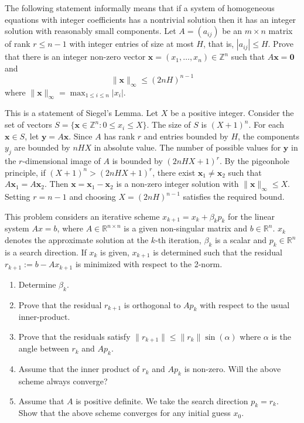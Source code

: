 \begin{exercise}
\label{applied:2016:8}
The following statement informally means that if a system of homogeneous equations with integer coefficients has a nontrivial solution then it has an integer solution with reasonably small components.
Let $A = (a_{ij})$ be an $m \times n$ matrix of rank $r \leq n-1$ with integer entries of size at most $H$, that is, $|a_{ij}| \leq H$.
Prove that there is an integer non-zero vector $\mathbf{x} = (x_1, \ldots, x_n) \in \mathbb{Z}^n$ such that $A\mathbf{x} = \mathbf{0}$ and
\[
\|\mathbf{x}\|_\infty \leq (2nH)^{n-1}
\]
where $\|\mathbf{x}\|_\infty = \max_{1 \leq i \leq n} |x_i|$.
\end{exercise}

\begin{solution}
This is a statement of Siegel's Lemma. Let $X$ be a positive integer. Consider the set of vectors $S = \{ \mathbf{x} \in \mathbb{Z}^n : 0 \le x_i \le X \}$. The size of $S$ is $(X+1)^n$. For each $\mathbf{x} \in S$, let $\mathbf{y} = A\mathbf{x}$. Since $A$ has rank $r$ and entries bounded by $H$, the components $y_j$ are bounded by $nHX$ in absolute value. The number of possible values for $\mathbf{y}$ in the $r$-dimensional image of $A$ is bounded by $(2nHX+1)^r$. By the pigeonhole principle, if $(X+1)^n > (2nHX+1)^r$, there exist $\mathbf{x}_1 \neq \mathbf{x}_2$ such that $A\mathbf{x}_1 = A\mathbf{x}_2$. Then $\mathbf{x} = \mathbf{x}_1 - \mathbf{x}_2$ is a non-zero integer solution with $\|\mathbf{x}\|_\infty \leq X$. Setting $r = n-1$ and choosing $X = (2nH)^{n-1}$ satisfies the required bound.
\end{solution}

\begin{exercise}
\label{applied:2016:9}
This problem considers an iterative scheme $x_{k+1} = x_k + \beta_k p_k$ for the linear system $Ax = b$, where $A \in \mathbb{R}^{n \times n}$ is a given non-singular matrix and $b \in \mathbb{R}^n$. $x_k$ denotes the approximate solution at the $k$-th iteration, $\beta_k$ is a scalar and $p_k \in \mathbb{R}^n$ is a search direction. If $x_k$ is given, $x_{k+1}$ is determined such that the residual $r_{k+1} := b - Ax_{k+1}$ is minimized with respect to the 2-norm.
\begin{enumerate}
    \item Determine $\beta_k$.
    \item Prove that the residual $r_{k+1}$ is orthogonal to $Ap_k$ with respect to the usual inner-product.
    \item Prove that the residuals satisfy $\|r_{k+1}\| \leq \|r_k\| \sin(\alpha)$ where $\alpha$ is the angle between $r_k$ and $Ap_k$.
    \item Assume that the inner product of $r_k$ and $Ap_k$ is non-zero. Will the above scheme always converge?
    \item Assume that $A$ is positive definite. We take the search direction $p_k = r_k$. Show that the above scheme converges for any initial guess $x_0$.
\end{enumerate}
\end{exercise}

